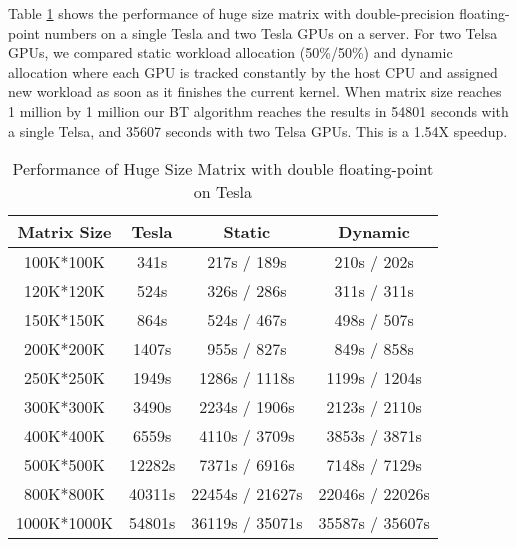 Table \ref{tab:hugeResultTesla} shows the performance of huge size matrix with double-precision floating-point numbers on a single Tesla and two Tesla GPUs on a server. For two Telsa GPUs, we compared static workload allocation (50\%/50\%) and dynamic allocation where each GPU is tracked constantly by the host CPU and assigned new workload as soon as it finishes the current kernel. 
When matrix size reaches 1 million by 1
million our BT algorithm reaches the results in 54801 seconds
with a single Telsa, and 35607 seconds with two Telsa GPUs. This is a 1.54X speedup.
\begin{table}[h]
\caption{Performance of Huge Size Matrix with double floating-point on Tesla}
\centering
\begin{tabular}{|c|c|c|c|}
\hline
Matrix Size &  Tesla  & Static & Dynamic \\ \hline
 100K*100K  &   341s  &  217s / 189s &  210s / 202s \\ \hline
 120K*120K  &   524s  &  326s / 286s &  311s / 311s \\ \hline
 150K*150K  &   864s  &  524s / 467s &  498s / 507s \\ \hline
 200K*200K  &  1407s  &  955s / 827s &  849s / 858s \\ \hline
 250K*250K  &  1949s  & 1286s / 1118s & 1199s / 1204s\\ \hline
 300K*300K  &  3490s  & 2234s / 1906s & 2123s / 2110s\\ \hline
 400K*400K  &  6559s  & 4110s / 3709s & 3853s / 3871s\\ \hline
 500K*500K  & 12282s  & 7371s / 6916s  & 7148s / 7129s\\ \hline
 800K*800K  & 40311s  & 22454s / 21627s &  22046s / 22026s   \\ \hline
 1000K*1000K & 54801s  & 36119s / 35071s   &  35587s / 35607s \\ \hline
\end{tabular}
\label{tab:hugeResultTesla}
\vspace{-0.15in}
\end{table}


